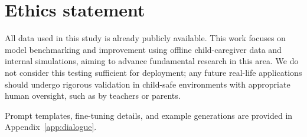 \section{Ethics statement}
All data used in this study is already publicly available.
This work focuses on model benchmarking and improvement using offline child-caregiver data and internal simulations, aiming to advance fundamental research in this area. We do not consider this testing sufficient for deployment; any future real-life applications should undergo rigorous validation in child-safe environments with appropriate human oversight, such as by teachers or parents.

Prompt templates, fine-tuning details, and example generations are provided in Appendix~\ref{app:dialogue}.
